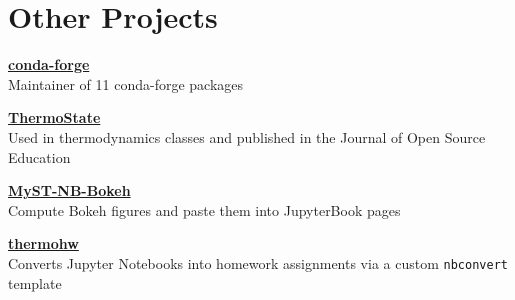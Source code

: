\section{Other Projects}
\begin{minipage}[t]{0.23\textwidth}
\textbf{\href{https://github.com/orgs/conda-forge/teams?query=\%40bryanwweber}{conda-forge}}\\
Maintainer of 11 conda-forge packages
\end{minipage}
\hfill\vline\hfill
\begin{minipage}[t]{0.23\textwidth}
\textbf{\href{https://github.com/bryanwweber/thermostate}{ThermoState}}\\
Used in thermodynamics classes and published in the Journal of Open Source Education
\end{minipage}
\hfill\vline\hfill
\begin{minipage}[t]{0.23\textwidth}
\textbf{\href{https://github.com/bryanwweber/MyST-NB-Bokeh}{MyST-NB-Bokeh}}\\
Compute Bokeh figures and paste them into JupyterBook pages
\end{minipage}
\hfill\vline\hfill
\begin{minipage}[t]{0.23\textwidth}
\textbf{\href{https://github.com/bryanwweber/thermohw}{thermohw}}\\
Converts Jupyter Notebooks into homework assignments via a custom \verb|nbconvert| template
\end{minipage}



